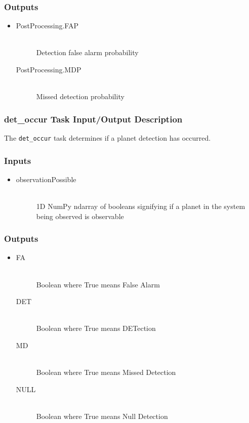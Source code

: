 \documentclass[cleanfoot]{asme2ej}
\begin{document}
\subsubsection*{Outputs}
\begin{itemize}
    \item 
    \begin{description}
        \item[PostProcessing.FAP] \hfill \\
        Detection false alarm probability
        \item[PostProcessing.MDP] \hfill \\
        Missed detection probability
    \end{description}
\end{itemize}

\subsubsection{det\_occur Task Input/Output Description} \label{sec:detoccurtask}
The \verb+det_occur+ task determines if a planet detection has occurred.

\subsubsection*{Inputs}
\begin{itemize}
    \item 
    \begin{description}
        \item[observationPossible] \hfill \\
        1D NumPy ndarray of booleans signifying if a planet in the system being observed is observable
    \end{description}
\end{itemize}

\subsubsection*{Outputs}
\begin{itemize}
    \item 
    \begin{description}
        \item[FA] \hfill \\
        Boolean where True means False Alarm
        \item[DET] \hfill \\
        Boolean where True means DETection
        \item[MD] \hfill \\
        Boolean where True means Missed Detection
        \item[NULL] \hfill \\
        Boolean where True means Null Detection
    \end{description}
\end{itemize}
\end{document}

